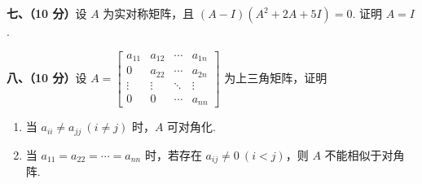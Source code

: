 \documentclass[a4paper,11pt]{ctexart}
\begin{document}
\vspace{0.8em}

\textbf{七、（10 分）}设 $A$ 为实对称矩阵，且 $(A - I)(A^2 + 2A + 5I) = 0$. 证明 $A = I$.

\vspace{0.8em}

\textbf{八、（10 分）}设 $A = \begin{bmatrix}
  a_{11} & a_{12} & \cdots & a_{1n} \\
  0 & a_{22} & \cdots & a_{2n} \\
  \vdots & \vdots & \ddots & \vdots \\
  0 & 0 & \cdots & a_{nn}
\end{bmatrix}$ 为上三角矩阵，证明
\begin{enumerate}[label=\arabic*., leftmargin=2.4em, itemsep=0.25em, topsep=0.3em]
  \item 当 $a_{ii} \neq a_{jj}\ (i \neq j)$ 时，$A$ 可对角化.
  \item 当 $a_{11} = a_{22} = \cdots = a_{nn}$ 时，若存在 $a_{ij} \neq 0\ (i < j)$，则 $A$ 不能相似于对角阵.
\end{enumerate}
\end{document}

